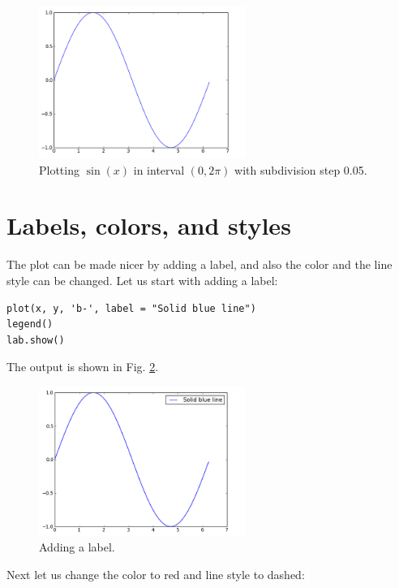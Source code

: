\documentclass{article}
\begin{document}
\begin{figure}[!ht]
\begin{center}
\includegraphics[width=0.6\textwidth]{img/plot1.png}
\end{center}
\vspace{-6mm}
\caption{Plotting $\sin(x)$ in interval $(0, 2\pi)$ with subdivision step 0.05.}
\label{fig:plot1}
\vspace{-2mm}
\end{figure}
\noindent

\section{Labels, colors, and styles}

The plot can be made nicer by adding a label, and also the color 
and the line style can be changed. Let us start with adding a label:

\begin{verbatim}
plot(x, y, 'b-', label = "Solid blue line")
legend()
lab.show()
\end{verbatim}
The output is shown in Fig. \ref{fig:plot2}.

\begin{figure}[!ht]
\begin{center}
\includegraphics[width=0.6\textwidth]{img/plot2.png}
\end{center}
\vspace{-6mm}
\caption{Adding a label.}
\label{fig:plot2}
\end{figure}
\newpage
\noindent
Next let us change the color to red and line style to dashed: 
\end{document}
